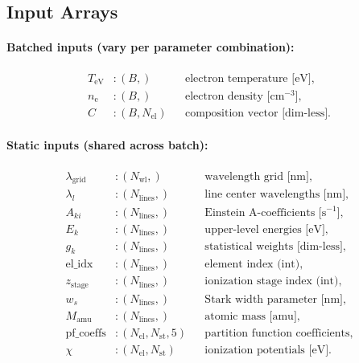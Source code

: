 \documentclass[11pt]{article}
\newcommand{\TeV}{T_\mathrm{eV}}
\newcommand{\ne}{n_\mathrm{e}}
\begin{document}
\subsection{Input Arrays}
\label{sec:inputs}

\paragraph{Batched inputs (vary per parameter combination):}
\begin{align}
  \TeV &\colon (B,) && \text{electron temperature [eV]}, \label{eq:T-shape}\\
  \ne   &\colon (B,) && \text{electron density [cm$^{-3}$]}, \label{eq:ne-shape}\\
  C     &\colon (B, N_\mathrm{el}) && \text{composition vector [dim-less]}. \label{eq:C-shape}
\end{align}

\paragraph{Static inputs (shared across batch):}
\begin{align}
  \lambda_\mathrm{grid} &\colon (N_\mathrm{wl},)
    && \text{wavelength grid [nm]}, \label{eq:wl-shape}\\
  \lambda_l &\colon (N_\mathrm{lines},)
    && \text{line center wavelengths [nm]}, \\
  A_{ki} &\colon (N_\mathrm{lines},)
    && \text{Einstein A-coefficients [s$^{-1}$]}, \\
  E_k &\colon (N_\mathrm{lines},)
    && \text{upper-level energies [eV]}, \\
  g_k &\colon (N_\mathrm{lines},)
    && \text{statistical weights [dim-less]}, \\
  \mathrm{el\_idx} &\colon (N_\mathrm{lines},)
    && \text{element index (int)}, \\
  z_\mathrm{stage} &\colon (N_\mathrm{lines},)
    && \text{ionization stage index (int)}, \\
  w_s &\colon (N_\mathrm{lines},)
    && \text{Stark width parameter [nm]}, \\
  M_\mathrm{amu} &\colon (N_\mathrm{lines},)
    && \text{atomic mass [amu]}, \\
  \text{pf\_coeffs} &\colon (N_\mathrm{el}, N_\mathrm{st}, 5)
    && \text{partition function coefficients}, \label{eq:pf-shape}\\
  \chi &\colon (N_\mathrm{el}, N_\mathrm{st})
    && \text{ionization potentials [eV]}. \label{eq:ip-shape}
\end{align}
\end{document}
